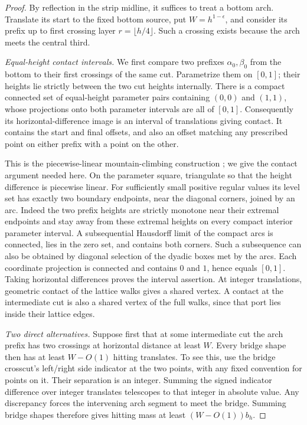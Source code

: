 \begin{proof}
By reflection in the strip midline, it suffices to treat a bottom
arch. Translate its start to the fixed bottom source, put
$W=h^{1-\epsilon}$, and consider its prefix up to first crossing
layer $r=\lfloor h/4\rfloor$. Such a crossing exists because the arch
meets the central third.

\emph{Equal-height contact intervals.}
We first compare two prefixes $\alpha_0,\beta_0$ from the bottom to
their first crossings of the same cut. Parametrize them on $[0,1]$;
their heights lie strictly between the two cut heights internally.
There is a compact connected set of equal-height parameter pairs
containing $(0,0)$ and $(1,1)$, whose projections onto both parameter
intervals are all of $[0,1]$. Consequently its horizontal-difference
image is an interval of translations giving contact. It contains the
start and final offsets, and also an offset matching any prescribed
point on either prefix with a point on the other.

This is the piecewise-linear mountain-climbing construction
\cite[Theorem~5.5]{Pak2010}; we give the contact argument needed here.
On the parameter square, triangulate so that the height difference is
piecewise linear. For sufficiently small positive regular values its
level set has exactly two boundary endpoints, near the diagonal
corners, joined by an arc. Indeed the two prefix heights are strictly
monotone near their extremal endpoints and stay away from these
extremal heights on every compact interior parameter interval.
A subsequential Hausdorff limit of the compact arcs is connected,
lies in the zero set, and contains both corners. Such a subsequence
can also be obtained by diagonal selection of the dyadic boxes met by
the arcs. Each coordinate projection is connected and contains $0$
and $1$, hence equals $[0,1]$. Taking horizontal differences proves
the interval assertion. At integer translations, geometric contact
of the lattice walks gives a shared vertex. A contact at the
intermediate cut is also a shared vertex of the full walks, since
that port lies inside their lattice edges.

\emph{Two direct alternatives.}
Suppose first that at some intermediate cut the arch prefix has two
crossings at horizontal distance at least $W$. Every bridge shape
then has at least $W-O(1)$ hitting translates. To see this, use the
bridge crosscut's left/right side indicator at the two points, with
any fixed convention for points on it. Their separation is an integer.
Summing the signed indicator difference over integer translates
telescopes to that integer in absolute value. Any discrepancy forces
the intervening arch segment to meet the bridge. Summing bridge
shapes therefore gives hitting mass at least $(W-O(1))b_h$.


\end{proof}
